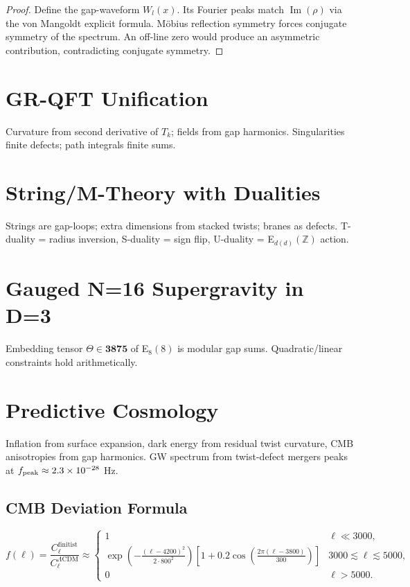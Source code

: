 \documentclass[11pt]{article}
\begin{document}
\begin{proof}
Define the gap-waveform \(W_l(x)\). Its Fourier peaks match \(\operatorname{Im}(\rho)\) via the von Mangoldt explicit formula. Möbius reflection symmetry forces conjugate symmetry of the spectrum. An off-line zero would produce an asymmetric contribution, contradicting conjugate symmetry.
\end{proof}

\section{GR-QFT Unification}
Curvature from second derivative of \(T_k\); fields from gap harmonics. Singularities finite defects; path integrals finite sums.

\section{String/M-Theory with Dualities}
Strings are gap-loops; extra dimensions from stacked twists; branes as defects. T-duality = radius inversion, S-duality = sign flip, U-duality = E\(_{d(d)}(\mathbb{Z})\) action.

\section{Gauged N=16 Supergravity in D=3}
Embedding tensor \(\Theta \in \mathbf{3875}\) of E\(_8(8)\) is modular gap sums. Quadratic/linear constraints hold arithmetically.

\section{Predictive Cosmology}
Inflation from surface expansion, dark energy from residual twist curvature, CMB anisotropies from gap harmonics. GW spectrum from twist-defect mergers peaks at \(f_{\rm peak} \approx 2.3 \times 10^{-28}\) Hz.

\subsection{CMB Deviation Formula}
\[
f(\ell) = \frac{C_\ell^{\text{finitist}}}{C_\ell^{\Lambda\text{CDM}}} \approx
\begin{cases}
1 & \ell \ll 3000, \\
\exp\left( -\frac{(\ell - 4200)^2}{2 \cdot 800^2} \right) \left[ 1 + 0.2 \cos\left( \frac{2\pi (\ell - 3800)}{300} \right) \right] & 3000 \lesssim \ell \lesssim 5000, \\
0 & \ell > 5000.
\end{cases}
\]
\end{document}
